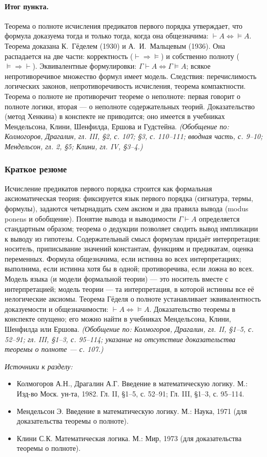 \documentclass[a4paper,12pt]{article}
\begin{document}
\paragraph{Итог пункта.} Теорема о полноте исчисления предикатов первого порядка утверждает, что формула доказуема тогда и только тогда, когда она общезначима: \(\vdash A\Leftrightarrow\models A\). Теорема доказана К.~Гёделем (1930) и А.~И.~Мальцевым (1936). Она распадается на две части: корректность (\(\vdash\Rightarrow\models\)) и собственно полноту (\(\models\Rightarrow\vdash\)). Эквивалентные формулировки: \(\Gamma\vdash A\Leftrightarrow\Gamma\models A\); всякое непротиворечивое множество формул имеет модель. Следствия: перечислимость логических законов, непротиворечивость исчисления, теорема компактности. Теорема о полноте не противоречит теореме о неполноте: первая говорит о полноте логики, вторая — о неполноте содержательных теорий. Доказательство (метод Хенкина) в конспекте не приводится; оно имеется в учебниках Мендельсона, Клини, Шенфилда, Ершова и Гудстейна.
\textit{(Обобщение по: Колмогоров, Драгалин, гл. III, §2, с. 107; §3, с. 110--111; вводная часть, с. 9--10; Мендельсон, гл. 2, §5; Клини, гл. IV, §3--4.)}

\subsubsection{Краткое резюме}

Исчисление предикатов первого порядка строится как формальная аксиоматическая теория: фиксируется язык первого порядка (сигнатура, термы, формулы), задаются четырнадцать схем аксиом и два правила вывода (modus ponens и обобщение). Понятие вывода и выводимости \(\Gamma\vdash A\) определяется стандартным образом; теорема о дедукции позволяет сводить вывод импликации к выводу из гипотезы. Содержательный смысл формулам придаёт интерпретация: носитель, приписывание значений константам, функциям и предикатам, оценка переменных. Формула общезначима, если истинна во всех интерпретациях; выполнима, если истинна хотя бы в одной; противоречива, если ложна во всех. Модель языка (и модели формальной теории) --- это носитель вместе с интерпретацией; модель теории --- та интерпретация, в которой истинны все её нелогические аксиомы. Теорема Гёделя о полноте устанавливает эквивалентность доказуемости и общезначимости: \(\vdash A\Leftrightarrow\models A\). Доказательство теоремы в конспекте опущено; его можно найти в учебниках Мендельсона, Клини, Шенфилда или Ершова.
\textit{(Обобщение по: Колмогоров, Драгалин, гл. II, §1--5, с. 52--91; гл. III, §1--3, с. 95--114; указание на отсутствие доказательства теоремы о полноте --- с. 107.)}

\noindent\textit{Источники к разделу:}
\begin{itemize}
\item Колмогоров А.Н., Драгалин А.Г. Введение в математическую логику. М.: Изд-во Моск. ун-та, 1982. Гл. II, §1--5, с. 52--91; Гл. III, §1--3, с. 95--114.
\item Мендельсон Э. Введение в математическую логику. М.: Наука, 1971 (для доказательства теоремы о полноте).
\item Клини С.К. Математическая логика. М.: Мир, 1973 (для доказательства теоремы о полноте).
\end{itemize}
\end{document}
